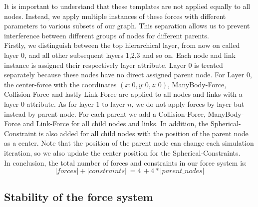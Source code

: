 It is important to understand that these templates are not applied equally to all nodes. Instead, we apply multiple instances of these forces with different parameters to various subsets of our graph. 
This separation allows us to prevent interference between different groups of nodes for different parents.\\ 
Firstly, we distinguish between the top hierarchical layer, from now on called layer $0$, and all other subsequent layers 1,2,3 and so on. Each node and link instance is assigned their respectively layer attribute. Layer $0$ is treated separately because these nodes have no direct assigned parent node. 
For Layer $0$, the center-force with the coordinates $(x:0,y:0,z:0)$, ManyBody-Force, Collision-Force and lastly Link-Force are applied to all nodes and links with a layer $0$ attribute. 
As for layer $1$ to layer $n$, we do not apply forces by layer but instead by parent node. For each parent we add a Collision-Force, ManyBody-Force and Link-Force for all child nodes and links. In addition, the Spherical-Constraint is also added for all child nodes with the position of the parent node as a center. Note that the position of the parent node can change each simulation iteration, so we also update the center position for the Spherical-Constraints.\\
In conclusion, the total number of forces and constraints in our force system is: 
\begin{equation}
    |forces| + |constraints| \: = 4 \, + 4 * |parent\_nodes|
\end{equation}

\subsection{Stability of the force system}

